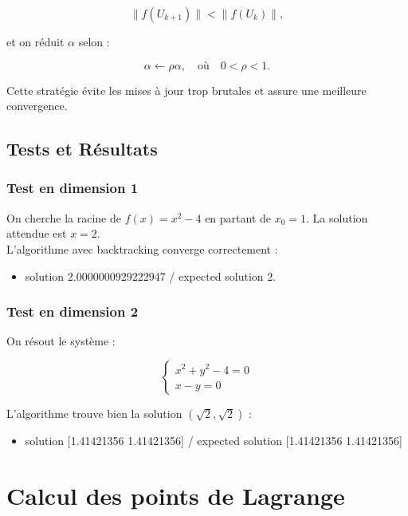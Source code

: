 \documentclass{article}
\begin{document}
\begin{equation}
\| f(U_{k+1}) \| < \| f(U_k) \|,
\end{equation}

et on réduit \( \alpha \) selon :

\begin{equation}
\alpha \leftarrow \rho \alpha, \quad \text{où} \quad 0 < \rho < 1.
\end{equation}

Cette stratégie évite les mises à jour trop brutales et assure une meilleure convergence.

\subsection{Tests et Résultats}
\subsubsection{Test en dimension 1} 
On cherche la racine de \( f(x) = x^2 - 4 \) en partant de \( x_0 = 1 \). La solution attendue est \( x = 2 \). \\
L'algorithme avec backtracking converge correctement : 
\begin{itemize}
\item solution 2.0000000929222947 / expected solution 2.
\end{itemize}

\subsubsection{Test en dimension 2}
On résout le système :

\begin{equation}
\begin{cases}
x^2 + y^2 - 4 = 0 \\
x - y = 0
\end{cases}
\end{equation}

L'algorithme trouve bien la solution \( (\sqrt{2}, \sqrt{2}) \) : 
\begin{itemize}
\item solution [1.41421356 1.41421356] / expected solution [1.41421356 1.41421356]
\end{itemize}


\section{Calcul des points de Lagrange}
\end{document}
